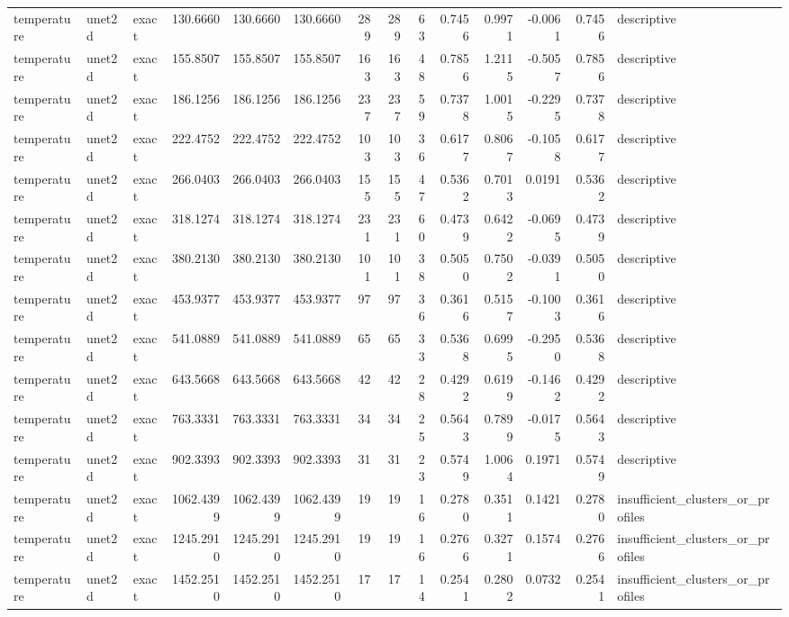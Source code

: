 \begin{tabular}{lllrrrrrrrrrrl}
temperature & unet2d & exact & 130.6660 & 130.6660 & 130.6660 & 289 & 289 & 63 & 0.7456 & 0.9971 & -0.0061 & 0.7456 & descriptive \\
temperature & unet2d & exact & 155.8507 & 155.8507 & 155.8507 & 163 & 163 & 48 & 0.7856 & 1.2115 & -0.5057 & 0.7856 & descriptive \\
temperature & unet2d & exact & 186.1256 & 186.1256 & 186.1256 & 237 & 237 & 59 & 0.7378 & 1.0015 & -0.2295 & 0.7378 & descriptive \\
temperature & unet2d & exact & 222.4752 & 222.4752 & 222.4752 & 103 & 103 & 36 & 0.6177 & 0.8067 & -0.1058 & 0.6177 & descriptive \\
temperature & unet2d & exact & 266.0403 & 266.0403 & 266.0403 & 155 & 155 & 47 & 0.5362 & 0.7013 & 0.0191 & 0.5362 & descriptive \\
temperature & unet2d & exact & 318.1274 & 318.1274 & 318.1274 & 231 & 231 & 60 & 0.4739 & 0.6422 & -0.0695 & 0.4739 & descriptive \\
temperature & unet2d & exact & 380.2130 & 380.2130 & 380.2130 & 101 & 101 & 38 & 0.5050 & 0.7502 & -0.0391 & 0.5050 & descriptive \\
temperature & unet2d & exact & 453.9377 & 453.9377 & 453.9377 & 97 & 97 & 36 & 0.3616 & 0.5157 & -0.1003 & 0.3616 & descriptive \\
temperature & unet2d & exact & 541.0889 & 541.0889 & 541.0889 & 65 & 65 & 33 & 0.5368 & 0.6995 & -0.2950 & 0.5368 & descriptive \\
temperature & unet2d & exact & 643.5668 & 643.5668 & 643.5668 & 42 & 42 & 28 & 0.4292 & 0.6199 & -0.1462 & 0.4292 & descriptive \\
temperature & unet2d & exact & 763.3331 & 763.3331 & 763.3331 & 34 & 34 & 25 & 0.5643 & 0.7899 & -0.0175 & 0.5643 & descriptive \\
temperature & unet2d & exact & 902.3393 & 902.3393 & 902.3393 & 31 & 31 & 23 & 0.5749 & 1.0064 & 0.1971 & 0.5749 & descriptive \\
temperature & unet2d & exact & 1062.4399 & 1062.4399 & 1062.4399 & 19 & 19 & 16 & 0.2780 & 0.3511 & 0.1421 & 0.2780 & insufficient_clusters_or_profiles \\
temperature & unet2d & exact & 1245.2910 & 1245.2910 & 1245.2910 & 19 & 19 & 16 & 0.2766 & 0.3271 & 0.1574 & 0.2766 & insufficient_clusters_or_profiles \\
temperature & unet2d & exact & 1452.2510 & 1452.2510 & 1452.2510 & 17 & 17 & 14 & 0.2541 & 0.2802 & 0.0732 & 0.2541 & insufficient_clusters_or_profiles \\

\end{tabular}
